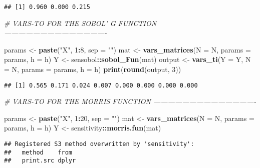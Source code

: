 \documentclass[11pt,]{article}
\newenvironment{Shaded}{\begin{snugshade}}{\end{snugshade}}
\newcommand{\CommentTok}[1]{\textcolor[rgb]{0.56,0.35,0.01}{\textit{#1}}}
\newcommand{\DataTypeTok}[1]{\textcolor[rgb]{0.13,0.29,0.53}{#1}}
\newcommand{\DecValTok}[1]{\textcolor[rgb]{0.00,0.00,0.81}{#1}}
\newcommand{\KeywordTok}[1]{\textcolor[rgb]{0.13,0.29,0.53}{\textbf{#1}}}
\newcommand{\NormalTok}[1]{#1}
\newcommand{\OperatorTok}[1]{\textcolor[rgb]{0.81,0.36,0.00}{\textbf{#1}}}
\newcommand{\StringTok}[1]{\textcolor[rgb]{0.31,0.60,0.02}{#1}}
\begin{document}
\begin{verbatim}
## [1] 0.960 0.000 0.215
\end{verbatim}

\begin{Shaded}
\begin{Highlighting}[]
\CommentTok{# VARS-TO FOR THE SOBOL' G FUNCTION -------------------------------------------}

\NormalTok{params <-}\StringTok{ }\KeywordTok{paste}\NormalTok{(}\StringTok{"X"}\NormalTok{, }\DecValTok{1}\OperatorTok{:}\DecValTok{8}\NormalTok{, }\DataTypeTok{sep =} \StringTok{""}\NormalTok{)}
\NormalTok{mat <-}\StringTok{ }\KeywordTok{vars_matrices}\NormalTok{(}\DataTypeTok{N =}\NormalTok{ N, }\DataTypeTok{params =}\NormalTok{ params, }\DataTypeTok{h =}\NormalTok{ h)}
\NormalTok{Y <-}\StringTok{ }\NormalTok{sensobol}\OperatorTok{::}\KeywordTok{sobol_Fun}\NormalTok{(mat)}
\NormalTok{output <-}\StringTok{ }\KeywordTok{vars_ti}\NormalTok{(}\DataTypeTok{Y =}\NormalTok{ Y, }\DataTypeTok{N =}\NormalTok{ N, }\DataTypeTok{params =}\NormalTok{ params, }\DataTypeTok{h =}\NormalTok{ h)}
\KeywordTok{print}\NormalTok{(}\KeywordTok{round}\NormalTok{(output, }\DecValTok{3}\NormalTok{))}
\end{Highlighting}
\end{Shaded}

\begin{verbatim}
## [1] 0.565 0.171 0.024 0.007 0.000 0.000 0.000 0.000
\end{verbatim}

\begin{Shaded}
\begin{Highlighting}[]
\CommentTok{# VARS-TO FOR THE MORRIS FUNCTION -------------------------------------------}

\NormalTok{params <-}\StringTok{ }\KeywordTok{paste}\NormalTok{(}\StringTok{"X"}\NormalTok{, }\DecValTok{1}\OperatorTok{:}\DecValTok{20}\NormalTok{, }\DataTypeTok{sep =} \StringTok{""}\NormalTok{)}
\NormalTok{mat <-}\StringTok{ }\KeywordTok{vars_matrices}\NormalTok{(}\DataTypeTok{N =}\NormalTok{ N, }\DataTypeTok{params =}\NormalTok{ params, }\DataTypeTok{h =}\NormalTok{ h)}
\NormalTok{Y <-}\StringTok{ }\NormalTok{sensitivity}\OperatorTok{::}\KeywordTok{morris.fun}\NormalTok{(mat)}
\end{Highlighting}
\end{Shaded}

\begin{verbatim}
## Registered S3 method overwritten by 'sensitivity':
##   method    from 
##   print.src dplyr
\end{verbatim}
\end{document}
